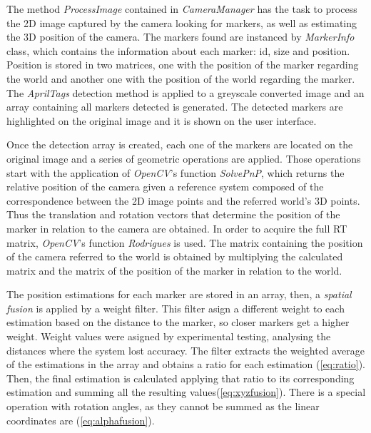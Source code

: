 \documentclass{styles/svproc}
\begin{document}
	
	
	The method \textit{ProcessImage} contained in \textit{CameraManager} has the task to process the 2D image captured by the camera looking for markers, as well as estimating the 3D position of the camera. The markers found are instanced by \textit{MarkerInfo} class, which contains the information about each marker: id, size and position. Position is stored in two matrices, one with the position of the marker regarding the world and another one with the position of the world regarding the marker. The \textit{AprilTags} detection method is applied to a greyscale converted image and an array containing all markers detected is generated. The detected markers are highlighted on the original image and it is shown on the user interface.
	
	Once the detection array is created, each one of the markers are located on the original image and a series of geometric operations are applied. Those operations start with the application of \textit{OpenCV}'s function \textit{SolvePnP}, which returns the relative position of the camera given a reference system composed of the correspondence between the 2D image points and the referred world's 3D points. Thus the translation and rotation vectors that determine the position of the marker in relation to the camera are obtained. In order to acquire the full RT matrix, \textit{OpenCV}'s function \textit{Rodrigues} is used. The matrix containing the position of the camera referred to the world is obtained by multiplying the calculated matrix and the matrix of the position of the marker in relation to the world.
	
	The position estimations for each marker are stored in an array, then, a \textit{spatial fusion} is applied by a weight filter. This filter asign a different weight to each estimation based on the distance to the marker, so closer markers get a higher weight. Weight values were asigned by experimental testing, analysing the distances where the system lost accuracy. The filter extracts the weighted average of the estimations in the array and obtains a ratio for each estimation (\ref{eq:ratio}). Then, the final estimation is calculated applying that ratio to its corresponding estimation and summing all the resulting values(\ref{eq:xyzfusion}). There is a special operation with rotation angles, as they cannot be summed as the linear coordinates are (\ref{eq:alphafusion}).
	
\end{document}
